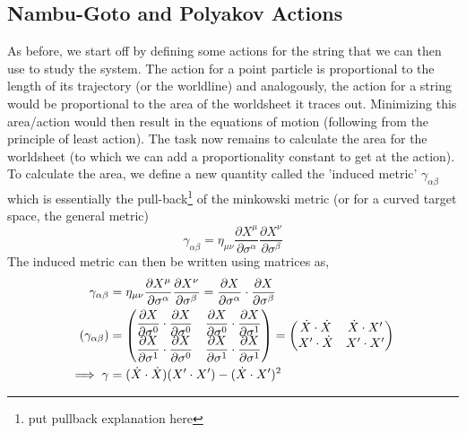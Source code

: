 \documentclass{article}
\begin{document}
\subsection{Nambu-Goto and Polyakov Actions}
As before, we start off by defining some actions for the string that we can then use to study the system. The action for a point particle is proportional to the length of its trajectory (or the worldline) and analogously, the action for a string would be proportional to the area of the worldsheet it traces out. Minimizing this area/action would then result in the equations of motion (following from the principle of least action). The task now remains to calculate the area for the worldsheet (to which we can add a proportionality constant to get at the action).\\ 

To calculate the area, we define a new quantity called the 'induced metric' $\gamma_{\alpha\beta}$ which is essentially the pull-back\footnote{put pullback explanation here} of the minkowski metric (or for a curved target space, the general metric) 	
\begin{equation}
	\gamma_{\alpha\beta} = \eta_{\mu\nu} \frac{\partial X^\mu}{\partial \sigma^\alpha}\frac{\partial X^\nu}{\partial \sigma^\beta} \label{eq:ind_met}
\end{equation}
The induced metric can then be written using matrices as,
\renewcommand{\arraystretch}{2.0}
\begin{align}
	\gamma_{\alpha\beta}&=\eta_{\mu\nu}\pdv{X^\mu}{\sigma^\alpha}\pdv{X^\nu}{\sigma^\beta} = \pdv{X}{\sigma^\alpha}\cdot\pdv{X}{\sigma^\beta}\\
	(\gamma_{\alpha\beta}) &= 
	\begin{pmatrix} 
		\dfrac{\partial X}{\partial \sigma^0} \cdot \dfrac{\partial X}{\partial\sigma^0} & \dfrac{\partial X}{\partial\sigma^0} \cdot \dfrac{\partial X}{\partial\sigma^1} \\
		\dfrac{\partial X}{\partial \sigma^1} \cdot \dfrac{\partial X}{\partial\sigma^0} & \dfrac{\partial X}{\partial\sigma^1} \cdot \dfrac{\partial X}{\partial\sigma^1} 
	\end{pmatrix} = 
	\begin{pmatrix}
		\dot{X} \cdot \dot{X} & \dot{X} \cdot X' \\
		X' \cdot \dot{X} & X' \cdot X'
	\end{pmatrix}\\
	\implies \gamma &= (\dot{X}\cdot\dot{X})(X'\cdot X') - (\dot{X}\cdot X')^2
\end{align}
\end{document}
